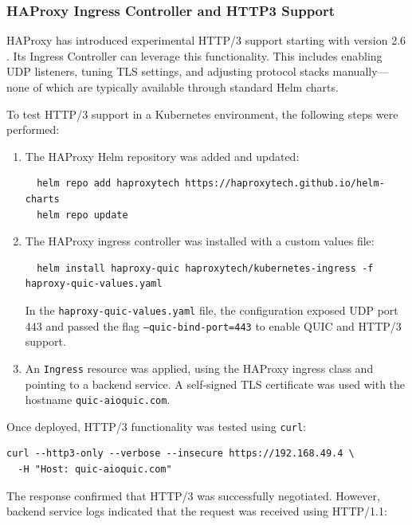 \subsubsection{HAProxy Ingress Controller and HTTP3 Support}
HAProxy has introduced experimental HTTP/3 support starting with version 2.6 \cite{haproxy-docs} \cite{haproxy-k8s-docs}. Its Ingress Controller can leverage this functionality. This includes enabling UDP listeners, tuning TLS settings, and adjusting protocol stacks manually—none of which are typically available through standard Helm charts. 


To test HTTP/3 support in a Kubernetes environment, the following steps were performed:

\begin{enumerate}
  \item The HAProxy Helm repository was added and updated:
  \begin{verbatim}
  helm repo add haproxytech https://haproxytech.github.io/helm-charts
  helm repo update
  \end{verbatim}

  \item The HAProxy ingress controller was installed with a custom values file:
  \begin{verbatim}
  helm install haproxy-quic haproxytech/kubernetes-ingress -f haproxy-quic-values.yaml
  \end{verbatim}

  In the \texttt{haproxy-quic-values.yaml} file, the configuration exposed UDP port 443 and passed the flag \texttt{--quic-bind-port=443} to enable QUIC and HTTP/3 support.

  \item An \texttt{Ingress} resource was applied, using the HAProxy ingress class and pointing to a backend service. A self-signed TLS certificate was used with the hostname \texttt{quic-aioquic.com}.
\end{enumerate}

Once deployed, HTTP/3 functionality was tested using \texttt{curl}:

\begin{verbatim}
curl --http3-only --verbose --insecure https://192.168.49.4 \
  -H "Host: quic-aioquic.com"
\end{verbatim}

The response confirmed that HTTP/3 was successfully negotiated. However, backend service logs indicated that the request was received using HTTP/1.1:

